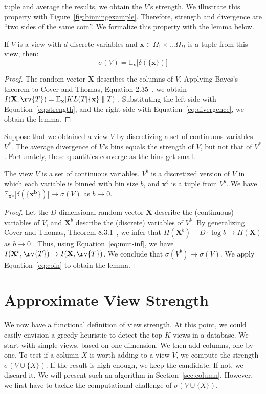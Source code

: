 tuple and average the results, we obtain the $V$'s strength.  We illustrate
this property with Figure~\ref{fig:binningexample}.  Therefore, strength and
divergence are ``two sides of the same coin''. We formalize this property with
the lemma below.
\begin{lemma}
    If $V$ is a view with $d$ discrete variables and $\mathbf{x} \in \Omega_1
    \times \ldots \Omega_D$ is a tuple from this view, then:
    \begin{equation}\label{eq:coin}
        \sigma(V) = \mathbb{E}_{\mathbf{x}}  \big[ \delta(\{\mathbf{x}\}) \big]
    \end{equation}
\end{lemma}
\begin{proof}
    The random vector $\mathbf{X}$ describes the columns of $V$. Applying
    Bayes's theorem to Cover and Thomas, Equation
    2.35~\cite{cover2012elements}, we obtain $ I(\mathbf{X} ; \rv{T})
    =\mathbb{E}_{\mathbf{x}}[ KL( T | \{\mathbf{x}\} \parallel T )]$.
    Substituting the left side with Equation~\ref{eq:strength}, and the right
    side with Equation~\ref{eq:divergence}, we obtain the lemma.
\end{proof}
Suppose that we obtained a view $V$ by discretizing a set of continuous
variables $V^*$. The average divergence of $V$'s bins equals the strength of $V$,
but not that of $V^*$. Fortunately, these quantities converge as the bins get
small.
\begin{lemma}
    The view $V$ is a set of continuous variables, $V^b$ is a discretized
    version of $V$ in which each variable is binned with bin size $b$, and
    $\mathbf{x}^b$ is a tuple from $V^b$. We have $\mathbb{E}_{\mathbf{x^b}}
    \big[ \delta(\{\mathbf{x^b}\}) \big] \to  \sigma(V)$ as $b \to 0$.
\end{lemma}
\begin{proof}
    Let the $D$-dimensional random vector $\mathbf{X}$ describe the
    (continuous) variables of $V$, and $\mathbf{X}^b$ describe the (discrete)
    variables of $V^b$. By generalizing Cover and Thomas, Theorem
    8.3.1~\cite{cover2012elements}, we infer that $H(\mathbf{X}^b) + D \cdot \log{b}
    \to H(\mathbf{X})$ as $b \to 0$ .  Thus, using Equation~\ref{eq:mut-inf},
    we have $I(\mathbf{X}^b, \rv{T}) \to I(\mathbf{X}, \rv{T})$. We conclude
    that $\sigma(V^b) \to \sigma(V)$. We apply Equation~\ref{eq:coin} to obtain
    the lemma.
\end{proof}


\section{Approximate View Strength}
\label{sec:approximate}
We now have a functional definition of view strength.  At this point, we could
easily envision a greedy heuristic to detect the top $K$ views in a database.
We start with simple views, based on one dimension. We then add columns, one by
one.  To test if a column $X$ is worth adding to a view $V$, we compute the
strength $\sigma(V \cup \{X\})$. If the result is high enough, we keep the
candidate. If not, we discard it. We will present such an algorithm in
Section~\ref{sec:column}. However, we first have to tackle the computational challenge of $\sigma(V \cup \{X\})$.

